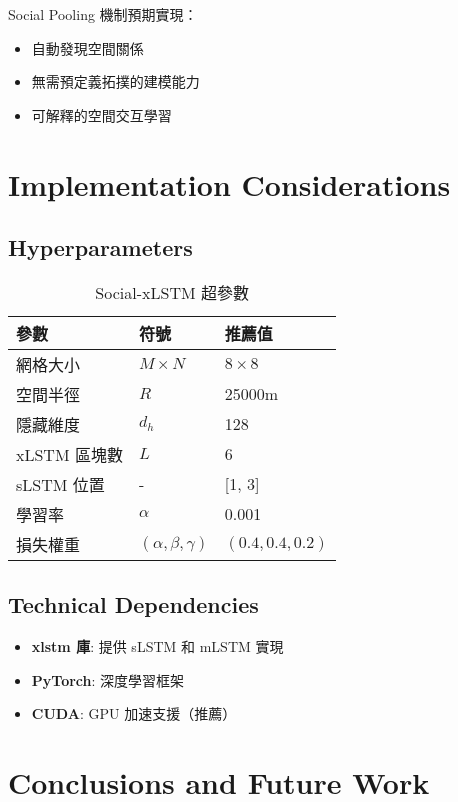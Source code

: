 \documentclass[11pt,a4paper]{article}
\begin{document}
Social Pooling 機制預期實現：
\begin{itemize}
\item 自動發現空間關係
\item 無需預定義拓撲的建模能力
\item 可解釋的空間交互學習
\end{itemize}

\section{Implementation Considerations}

\subsection{Hyperparameters}

\begin{table}[h]
\centering
\begin{tabular}{|l|l|l|}
\hline
參數 & 符號 & 推薦值 \\
\hline
網格大小 & $M \times N$ & $8 \times 8$ \\
空間半徑 & $R$ & 25000m \\
隱藏維度 & $d_h$ & 128 \\
xLSTM 區塊數 & $L$ & 6 \\
sLSTM 位置 & - & [1, 3] \\
學習率 & $\alpha$ & 0.001 \\
損失權重 & $(\alpha, \beta, \gamma)$ & $(0.4, 0.4, 0.2)$ \\
\hline
\end{tabular}
\caption{Social-xLSTM 超參數}
\end{table}

\subsection{Technical Dependencies}

\begin{itemize}
\item \textbf{xlstm 庫}: 提供 sLSTM 和 mLSTM 實現
\item \textbf{PyTorch}: 深度學習框架
\item \textbf{CUDA}: GPU 加速支援（推薦）
\end{itemize}

\section{Conclusions and Future Work}
\end{document}
